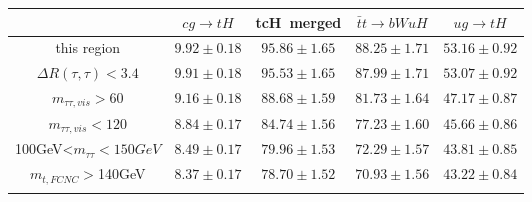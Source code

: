 \begin{tabular}{ccccc} \toprule\toprule
 & $cg\to tH$ & tcH~merged & $\bar{t}t\to bWuH$ & $ug\to tH$\\\midrule
this region & $9.92\pm0.18$ & $95.86\pm1.65$ & $88.25\pm1.71$ & $53.16\pm0.92$\\
$\Delta R(\tau,\tau)<3.4$ & $9.91\pm0.18$ & $95.53\pm1.65$ & $87.99\pm1.71$ & $53.07\pm0.92$\\
$m_{\tau\tau,vis}>60$ & $9.16\pm0.18$ & $88.68\pm1.59$ & $81.73\pm1.64$ & $47.17\pm0.87$\\
$m_{\tau\tau,vis}<120$ & $8.84\pm0.17$ & $84.74\pm1.56$ & $77.23\pm1.60$ & $45.66\pm0.86$\\
100GeV<$m_{\tau\tau}<150GeV$ & $8.49\pm0.17$ & $79.96\pm1.53$ & $72.29\pm1.57$ & $43.81\pm0.85$\\
$m_{t,FCNC}>$140GeV & $8.37\pm0.17$ & $78.70\pm1.52$ & $70.93\pm1.56$ & $43.22\pm0.84$\\
\bottomrule\bottomrule\\
\end{tabular}
